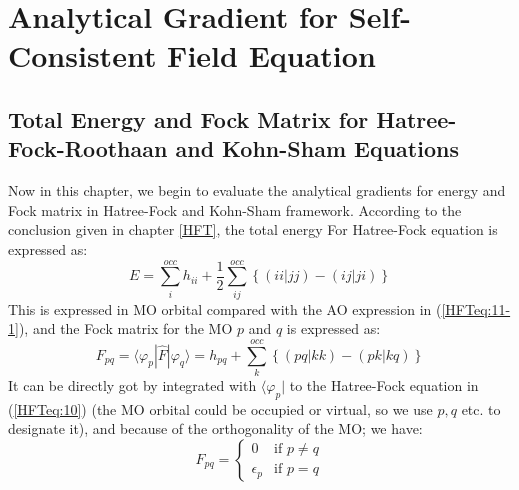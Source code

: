 %
%
%
%
%
%


\chapter{Analytical Gradient for Self-Consistent Field Equation}
%
%
%

\section{Total Energy and Fock Matrix for Hatree-Fock-Roothaan and Kohn-Sham
Equations}
%
%
%
%
Now in this chapter, we begin to evaluate the analytical gradients for energy
and Fock matrix in Hatree-Fock and Kohn-Sham framework. According to the
conclusion given in chapter \ref{HFT}, the total energy For Hatree-Fock equation
is expressed as:
\begin{equation}
 \label{TE_FM_HF_gradient_eq:1}
E = \sum_{i}^{occ}h_{ii} + \frac{1}{2}
    \sum_{ij}^{occ}
    \left \{ ( ii|jj) - ( ij|ji)
    \right \} 
\end{equation}
This is expressed in MO orbital compared with the AO expression in
(\ref{HFTeq:11-1}), and the Fock matrix for the MO $p$ and $q$ is expressed as:
\begin{equation}
\label{TE_FM_HF_gradient_eq:2}
F_{pq} = \langle\varphi_{p}|\hat{F}|\varphi_{q}\rangle = h_{pq} + 
\sum_{k}^{occ}\left \{  (pq|kk) - ( pk|kq)\right \} 
\end{equation}
It can be directly got by integrated with $ \langle\varphi_{p}|$ to the
Hatree-Fock equation in (\ref{HFTeq:10}) (the MO orbital could be occupied or
virtual, so we use $p,q$ etc. to designate it), and because of the orthogonality
of the MO; we have:
\begin{equation}
 \label{TE_FM_HF_gradient_eq:3}
F_{pq} = 
\begin{cases}
 0  &\text{if $p \neq q$} \\
\epsilon_{p} &\text{if $p = q$}
\end{cases}
\end{equation}

